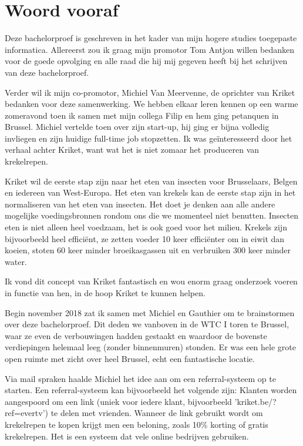 
\chapter*{Woord vooraf}
\label{ch:voorwoord}

Deze bachelorproef is geschreven in het kader van mijn hogere studies toegepaste informatica. Allereerst zou ik graag mijn promotor Tom Antjon willen bedanken voor de goede opvolging en alle raad die hij mij gegeven heeft bij het schrijven van deze bachelorproef. 

Verder wil ik mijn co-promotor, Michiel Van Meervenne, de oprichter van Kriket bedanken voor deze samenwerking. We hebben elkaar leren kennen op een warme zomeravond toen ik samen met mijn collega Filip en hem ging petanquen in Brussel. Michiel vertelde toen over zijn start-up, hij ging er bijna volledig invliegen en zijn huidige full-time job stopzetten. Ik was geïnteresseerd door het verhaal achter Kriket, want wat het is niet zomaar het produceren van krekelrepen. 

Kriket wil de eerste stap zijn naar het eten van insecten voor Brusselaars, Belgen en iedereen van West-Europa. Het eten van krekels kan de eerste stap zijn in het normaliseren van het eten van insecten. Het doet je denken aan alle andere mogelijke voedingsbronnen rondom ons die we momenteel niet benutten. Insecten eten is niet alleen heel voedzaam, het is ook goed voor het milieu. Krekels zijn bijvoorbeeld heel efficiënt, ze zetten voeder 10 keer efficiënter om in eiwit dan koeien, stoten 60 keer minder broeikasgassen uit en verbruiken 300 keer minder water. \autocite{Kriket2018}

Ik vond dit concept van Kriket fantastisch en wou enorm graag onderzoek voeren in functie van hen, in de hoop Kriket te kunnen helpen. 

Begin november 2018 zat ik samen met Michiel en Gauthier om te brainstormen over deze bachelorproef. Dit deden we vanboven in de WTC I toren te Brussel, waar ze even de verbouwingen hadden gestaakt en waardoor de bovenste verdiepingen helemaal leeg (zonder binnenmuren) stonden. Er was een hele grote open ruimte met zicht over heel Brussel, echt een fantastische locatie.

Via mail spraken haalde Michiel het idee aan om een referral-systeem op te starten. Een referral-systeem kan bijvoorbeeld het volgende zijn: Klanten worden aangespoord om een link (uniek voor iedere klant, bijvoorbeeld 'kriket.be/?ref=evertv') te delen met vrienden. Wanneer de link gebruikt wordt om krekelrepen te kopen krijgt men een beloning, zoals 10\% korting of gratis krekelrepen. Het is een systeem dat vele online bedrijven gebruiken. 

